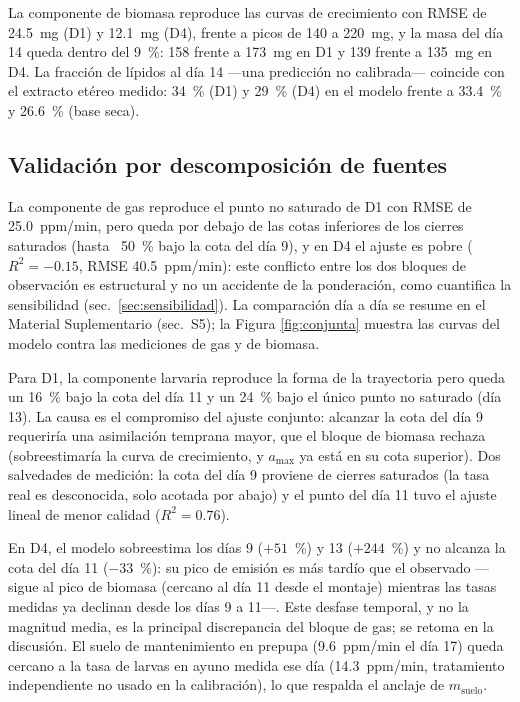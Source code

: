 La componente de biomasa reproduce las curvas de crecimiento con RMSE de 24.5~mg (D1) y 12.1~mg (D4), frente a picos de 140 a 220~mg, y la masa del día 14 queda dentro del 9~\%: 158 frente a 173~mg en D1 y 139 frente a 135~mg en D4. La fracción de lípidos al día 14 ---una predicción no calibrada--- coincide con el extracto etéreo medido: 34~\% (D1) y 29~\% (D4) en el modelo frente a 33.4~\% y 26.6~\% (base seca).

\subsection{Validación por descomposición de fuentes}

La componente de gas reproduce el punto no saturado de D1 con RMSE de 25.0~ppm/min, pero queda por debajo de las cotas inferiores de los cierres saturados (hasta ~50~\% bajo la cota del día 9), y en D4 el ajuste es pobre ($R^2 = -0.15$, RMSE 40.5~ppm/min): este conflicto entre los dos bloques de observación es estructural y no un accidente de la ponderación, como cuantifica la sensibilidad (sec.~\ref{sec:sensibilidad}). La comparación día a día se resume en el Material Suplementario (sec.~S5); la Figura \ref{fig:conjunta} muestra las curvas del modelo contra las mediciones de gas y de biomasa.

Para D1, la componente larvaria reproduce la forma de la trayectoria pero queda un 16~\% bajo la cota del día 11 y un 24~\% bajo el único punto no saturado (día 13). La causa es el compromiso del ajuste conjunto: alcanzar la cota del día 9 requeriría una asimilación temprana mayor, que el bloque de biomasa rechaza (sobreestimaría la curva de crecimiento, y $a_{\max}$ ya está en su cota superior). Dos salvedades de medición: la cota del día 9 proviene de cierres saturados (la tasa real es desconocida, solo acotada por abajo) y el punto del día 11 tuvo el ajuste lineal de menor calidad ($R^2 = 0.76$).

En D4, el modelo sobreestima los días 9 ($+51$~\%) y 13 ($+244$~\%) y no alcanza la cota del día 11 ($-33$~\%): su pico de emisión es más tardío que el observado ---sigue al pico de biomasa (cercano al día 11 desde el montaje) mientras las tasas medidas ya declinan desde los días 9 a 11---. Este desfase temporal, y no la magnitud media, es la principal discrepancia del bloque de gas; se retoma en la discusión. El suelo de mantenimiento en prepupa (9.6~ppm/min el día 17) queda cercano a la tasa de larvas en ayuno medida ese día (14.3~ppm/min, tratamiento independiente no usado en la calibración), lo que respalda el anclaje de $m_{\mathrm{suelo}}$.

